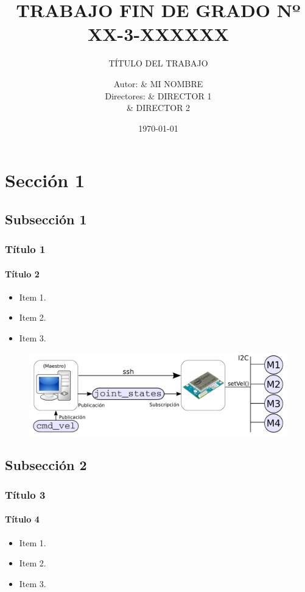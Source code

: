\documentclass{beamer}
\title{TRABAJO FIN DE GRADO Nº XX-3-XXXXXX}
\subtitle{TÍTULO DEL TRABAJO}
\author[MI NOMBRE]{%
	Autor: & MI NOMBRE \\
	Directores: & DIRECTOR 1 \\
				& DIRECTOR 2 \\
}
\date{\today}
\begin{document}
\begin{frame}[plain,t]
\titlepage
\end{frame}

\begin{frame}{\contentsname}
	\begin{multicols}{2}
		\noindent
		\tableofcontents
	\end{multicols}
\end{frame}


\section{Sección 1}
\subsection{Subsección 1}
\begin{frame}
	\frametitle{Título 1}
	\framesubtitle{Título 2}
	\begin{itemize}
		\item Item 1.
		\item Item 2.
		\item Item 3.
	\end{itemize}
	
	\begin{figure}[htb]
		\centering
		\includegraphics[width = 0.85\linewidth]{imagenes/carro.pdf}
	\end{figure}
\end{frame}

\subsection{Subsección 2}
\begin{frame}
	\frametitle{Título 3}
	\framesubtitle{Título 4}
	\begin{itemize}
		\item Item 1.
		\item Item 2.
		\item Item 3.
	\end{itemize}
\end{frame}
\end{document}
